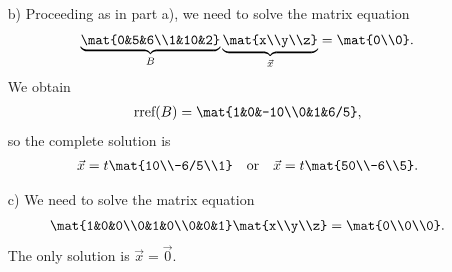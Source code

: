 \begin{exercises}
\begin{problist}
\begin{solution}
\begin{enumerate}
		
				\item[b)] Proceeding as in part a), we need to solve the matrix equation
				\begin{align*}
					\underbrace{\mat{0&5&6\\1&10&2} }_{B} \underbrace{\mat{x\\y\\z}}_{\vec{x}} = \mat{0\\0}.
				\end{align*}
			We obtain
				\begin{align}
					\textrm{rref}(B) = \mat{1&0&-10\\0&1&6/5},
				\end{align}
			so the complete solution is 
				\begin{align*}
					\vec{x} = t\mat{10\\-6/5\\1} \ \ \ \textrm{or} \ \ \ \vec{x} = t\mat{50\\-6\\5}.
				\end{align*}
		
		
				\item[c)] We need to solve the matrix equation
				\begin{align*}
					\mat{1&0&0\\0&1&0\\0&0&1} \mat{x\\y\\z} = \mat{0\\0\\0}.
				\end{align*}
			The only solution is $\vec{x} = \vec{0}$.
		

\end{enumerate}
\end{solution}
\end{problist}
\end{exercises}

